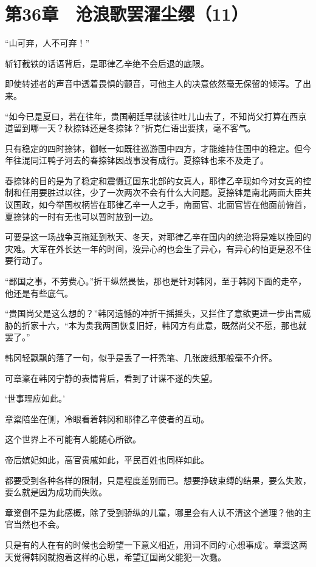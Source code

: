 \section{第36章　沧浪歌罢濯尘缨（11）}

“山可弃，人不可弃！”

斩钉截铁的话语背后，是耶律乙辛绝不会后退的底限。

即使转述者的声音中透着畏惧的颤音，可他主人的决意依然毫无保留的倾泻。了出来。

“如今已是夏曰，若在往年，贵国朝廷早就该往吐儿山去了，不知尚父打算在西京道留到哪一天？秋捺钵还是冬捺钵？”折克仁语出要挟，毫不客气。

只有稳定的四时捺钵，御帐一如既往巡游国中四方，才能维持住国中的稳定。但今年往混同江鸭子河去的春捺钵因战事没有成行。夏捺钵也来不及走了。

春捺钵的目的是为了稳定和震慑辽国东北部的女真人，耶律乙辛现如今对女真的控制和任用要胜过以往，少了一次两次不会有什么大问题。夏捺钵是南北两面大臣共议国政，如今举国权柄皆在耶律乙辛一人之手，南面官、北面官皆在他面前俯首，夏捺钵的一时有无也可以暂时放到一边。

可要是这一场战争真拖延到秋天、冬天，对耶律乙辛在国内的统治将是难以挽回的灾难。大军在外长达一年的时间，没异心的也会生了异心，有异心的怕更是忍不住要行动了。

“鄙国之事，不劳费心。”折干纵然畏怯，那也是针对韩冈，至于韩冈下面的走卒，他还是有些底气。

“贵国尚父是这么想的？”韩冈遗憾的冲折干摇摇头，又拦住了意欲更进一步出言威胁的折家十六，“本为贵我两国恢复旧好，韩冈方有此意，既然尚父不愿，那也就罢了。”

韩冈轻飘飘的落了一句，似乎是丢了一杆秃笔、几张废纸那般毫不介怀。

可章楶在韩冈宁静的表情背后，看到了计谋不遂的失望。

‘世事理应如此。’

章楶陪坐在侧，冷眼看着韩冈和耶律乙辛使者的互动。

这个世界上不可能有人能随心所欲。

帝后嫔妃如此，高官贵戚如此，平民百姓也同样如此。

都要受到各种各样的限制，只是程度差别而已。想要挣破束缚的结果，要么失败，要么就是因为成功而失败。

章楶倒不是为此感概，除了受到骄纵的儿童，哪里会有人认不清这个道理？他的主官当然也不会。

只是有的人在有的时候也会盼望一下意义相近，用词不同的‘心想事成’。章楶这两天觉得韩冈就抱着这样的心思，希望辽国尚父能犯一次蠢。


